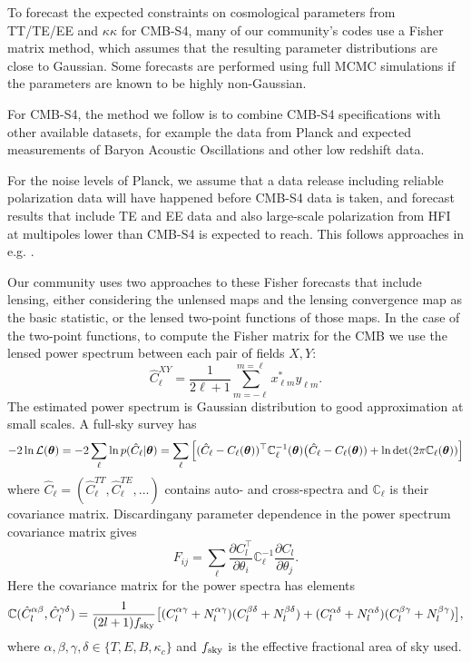 To forecast the expected constraints on cosmological parameters from TT/TE/EE and $\kappa\kappa$ for CMB-S4, many of our community's codes use a Fisher matrix method, which assumes that the resulting parameter distributions are close to Gaussian.  Some forecasts are performed using full MCMC simulations if the parameters are known to be highly non-Gaussian. 

For CMB-S4, the method we follow is to combine CMB-S4 specifications with other available datasets, for example the data from Planck and expected measurements of Baryon Acoustic Oscillations and other low redshift data. 

For the noise levels of Planck, we assume that a data release including reliable polarization data will have happened before CMB-S4 data is taken, and forecast results that include TE and EE data and also large-scale polarization from HFI at multipoles lower than CMB-S4 is expected to reach. This follows approaches in e.g. \cite{allison/etal:2015}.

Our community uses two approaches to these Fisher forecasts that include lensing, either considering the unlensed maps  and the lensing convergence map as the basic statistic, or the lensed two-point functions of those maps. In the case of the two-point functions, to compute the Fisher matrix for the CMB we use the lensed power spectrum between each pair of fields $X, Y$:
%
\begin{equation}
\label{eqEstimator}
\hat{C}^{XY}_\ell = \frac{1}{2\ell+1}\sum_{m=-\ell}^{m=\ell} x^{*}_{\ell m} y_{\ell m}.
\end{equation}
%
The estimated power spectrum is Gaussian distribution to good approximation at small scales. A full-sky survey has
%
\begin{equation}
-2\ln\mathcal{L}(\boldsymbol{\theta}) = -2\sum_\ell \ln p( \hat{C}_\ell | \boldsymbol{\theta}) \\
=  \sum_\ell  \Big[ (\hat{C}_\ell - C_\ell(\boldsymbol{\theta}) )^\top  \mathbb{C}^{-1}_\ell(\boldsymbol{\theta}) \big(\hat{C}_\ell - C_\ell(\boldsymbol{\theta})) + \ln \det(2 \pi \mathbb{C}_\ell(\boldsymbol{\theta})) \Big]
\end{equation}
%
where $ \hat{C}_\ell = (\hat{C}_\ell^{TT}, \hat{C}_\ell^{TE}, ...) $ contains auto- and cross-spectra and $\mathbb{C}_\ell$ is their covariance matrix. Discardingany parameter dependence in the power spectrum covariance matrix gives
%
\begin{equation}
F_{ij} = \sum_\ell \frac{\partial C^\top_l}{\partial \theta_i} \mathbb{C}^{-1}_\ell \frac{\partial C_l}{\partial \theta_j}.
\end{equation}
%
Here the covariance matrix for the power spectra has elements
%
\begin{equation}
\mathbb{C}(\hat{C}_l^{\alpha \beta}, \hat{C}_l^{\gamma \delta}) = \frac{1}{(2l+1)f_{\rm sky}} \big[ (C_l^{\alpha \gamma} + N_l^{\alpha \gamma}) (C_l^{\beta \delta} + N_l^{\beta \delta})  \\
+ (C_l^{\alpha \delta} + N_l^{\alpha \delta}) (C_l^{\beta \gamma} + N_l^{\beta \gamma}) \big],
\end{equation}
%
where $\alpha, \beta, \gamma, \delta \in \{T, E, B, \kappa_c\}$ and $f_{\rm sky}$ is the effective fractional area of sky used. 

